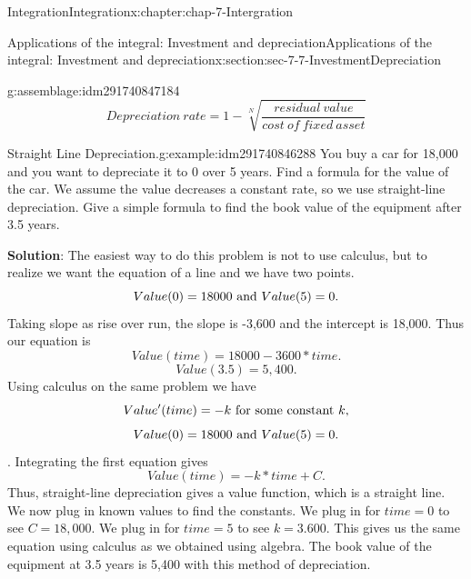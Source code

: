 \documentclass[oneside,10pt,]{book}
\newcommand{\terminology}[1]{\textbf{#1}}
\numberwithin{equation}{section}
\begin{document}
\begin{chapterptx}{Integration}{}{Integration}{}{}{x:chapter:chap-7-Intergration}
\begin{sectionptx}{Applications of the integral: Investment and depreciation}{}{Applications of the integral: Investment and depreciation}{}{}{x:section:sec-7-7-InvestmentDepreciation}
\begin{itemize}[label=\textbullet]
\begin{assemblage}{}{g:assemblage:idm291740847184}%
%
\begin{equation*}
Depreciation\ rate=1- \sqrt[N]{
\frac{residual\ value}{cost\ of\ fixed\ asset}}
\end{equation*}
%
\end{assemblage}
\end{itemize}
\begin{example}{Straight Line Depreciation.}{g:example:idm291740846288}%
You buy a car for \textdollar{}18,000 and you want to depreciate it to \textdollar{}0 over 5 years. Find a formula for the value of the car. We assume the value decreases a constant rate, so we use straight-line depreciation.  Give a simple formula to find the book value of the equipment after 3.5 years.%
\par
\terminology{Solution}: The easiest way to do this problem is not to use calculus, but to realize we want the equation of a line and we have two points.%
%
\begin{equation*}
Value(0)=18000 \hbox{ and } Value(5)=0.
\end{equation*}
Taking slope as rise over run, the slope is -3,600 and the intercept is 18,000.  Thus our equation is%
%
\begin{equation*}
Value(time)=18000-3600*time.
\end{equation*}
%
\begin{equation*}
Value(3.5)=5,400.
\end{equation*}
Using calculus on the same problem we have%
%
\begin{equation*}
Value' (time)=-k\hbox{ for some constant }k, 
\end{equation*}
%
\begin{equation*}
Value(0)=18000\hbox{ and } Value(5)=0.
\end{equation*}
. Integrating the first equation gives%
%
\begin{equation*}
Value(time)=-k*time+C.
\end{equation*}
Thus, straight-line depreciation gives a value function, which is a straight line.  We now plug in known values to find the constants.  We plug in for \(time = 0\) to see \(C = 18,000\).  We plug in for \(time = 5\) to see \(k = 3.600\).  This gives us the same equation using calculus as we obtained using algebra.  The book value of the equipment at 3.5 years is \textdollar{}5,400 with this method of depreciation.%
\begin{sidebyside}{1}{0.2}{0.2}{0}%
\begin{sbspanel}{0.6}%

\end{sbspanel}
\end{sidebyside}
\end{example}
\end{sectionptx}
\end{chapterptx}
\end{document}

